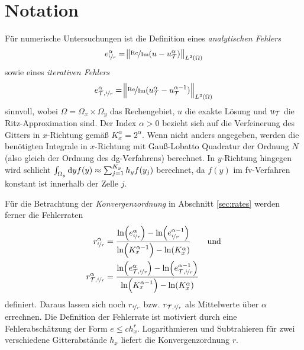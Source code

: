 \section{Notation}\label{sec:notation_4}
Für numerische Untersuchungen ist die Definition eines \emph{analytischen Fehlers} 
\begin{equation}
  e_{\nicefrac{i}{r}}^{\alpha} = \norm{\nicefrac{\operatorname{Re}}{\operatorname{Im}} (u - u_{\mathcal{T}}^{\alpha})}_{L^2(\Omega)}
  \label{eq:error_ana}
\end{equation}
sowie eines \emph{iterativen Fehlers}
\begin{equation}
  e_{\mathcal{T}, \nicefrac{i}{r}}^{\alpha} = \norm{\nicefrac{\operatorname{Re}}{\operatorname{Im}} (u_{\mathcal{T}}^{\alpha} - u_{\mathcal{T}}^{\alpha-1})}_{L^2(\Omega)}
\end{equation}
sinnvoll, wobei $\Omega=\Omega_x \times \Omega_y$ das Rechengebiet, $u$ die exakte Lösung und $u_{\mathcal{T}}$ die Ritz-Approximation sind. Der Index $\alpha>0$ bezieht sich auf die Verfeinerung des Gitters in $x$-Richtung gemäß $K_x^{\alpha} = 2^\alpha$. Wenn nicht anders angegeben, werden die benötigten Integrale in $x$-Richtung mit Gauß-Lobatto Quadratur der Ordnung $N$ (also gleich der Ordnung des \ac{dg}-Verfahrens) berechnet.
In $y$-Richtung hingegen wird schlicht $\int_{\Omega_y}\mathop{}\!\mathrm{d} y f(y) \approx \sum_{j=1}^{K_y} h_y f(y_j)$ berechnet, da $f(y)$ im \ac{fv}-Verfahren konstant ist innerhalb der Zelle $j$.

Für die Betrachtung der \emph{Konvergenzordnung} in Abschnitt \ref{sec:rates} werden ferner die Fehlerraten
\begin{equation}
\begin{aligned}
  r_{\nicefrac{i}{r}}^{\alpha} &= \frac{\ln(e_{\nicefrac{i}{r}}^{\alpha}) - \ln(e_{\nicefrac{i}{r}}^{\alpha-1})}{\ln(K_x^{\alpha-1}) - \ln(K_x^{\alpha})} \qquad\text{und}\\
  r_{\mathcal{T},\nicefrac{i}{r}}^{\alpha} &= \frac{\ln(e_{\mathcal{T},\nicefrac{i}{r}}^{\alpha}) - \ln(e_{\mathcal{T},\nicefrac{i}{r}}^{\alpha-1})}{\ln(K_x^{\alpha-1}) - \ln(K_x^{\alpha})}
\end{aligned}
  \label{eq:fehlerraten}
\end{equation}
definiert. Daraus lassen sich noch $r_{\nicefrac{i}{r}}$ bzw. $r_{\mathcal{T},\nicefrac{i}{r}}$ als Mittelwerte über $\alpha$ errechnen. Die Definition der Fehlerrate ist motiviert durch eine Fehlerabschätzung der Form $e \leq ch_x^r$. Logarithmieren und Subtrahieren für zwei verschiedene Gitterabstände $h_x$ liefert die Konvergenzordnung $r$.

